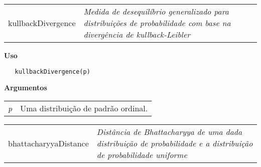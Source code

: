 \documentclass[12pt,letterpaper]{article}
\begin{document}
\hrulefill   

\begin{table}[!h]
\begin{center}
\begin{tabularx}{\textwidth}{ X X}
\hspace{0.5cm} kullbackDivergence & \textit{Medida de desequilíbrio generalizado para distribuições de probabilidade com base na divergência de kullback-Leibler}\\
\end{tabularx}
\end{center}
\end{table} 

\vspace{-0.5cm}

\hrulefill  

\vspace{0.5cm}

\textbf{Uso}

\begin{lstlisting}
   kullbackDivergence(p)
\end{lstlisting}

\vspace{0.5cm}

\textbf{Argumentos}

\begin{table}[!h]
\begin{center}
\begin{tabularx}{\textwidth}{X X}
\hspace{0.5cm} \textit{p} & Uma distribuição de padrão ordinal.\\
\end{tabularx}
\end{center}
\end{table} 

\newpage


\hrulefill   

\begin{table}[!h]
\begin{center}
\begin{tabularx}{\textwidth}{ X X}
\hspace{0.5cm} bhattacharyyaDistance & \textit{Distância de Bhattacharyya de uma dada distribuição de probabilidade e a distribuição de probabilidade uniforme}\\
\end{tabularx}
\end{center}
\end{table} 
\end{document}
